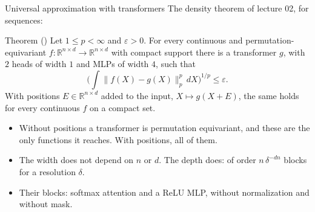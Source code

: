 \documentclass[10pt]{beamer}
\newcommand{\R}{\mathbb{R}}
\begin{document}
\begin{frame}{Universal approximation with transformers}
\small
The density theorem of lecture 02, for sequences:
\begin{mathbox}{Theorem (\citet{yun2020})}
Let $1\le p<\infty$ and $\varepsilon>0$. For every continuous and permutation-equivariant $f\colon\R^{n\times d}\to\R^{n\times d}$ with compact support there is a transformer $g$, with $2$ heads of width $1$ and MLPs of width $4$, such that
\[
\Big(\int\|f(X)-g(X)\|_p^p\,dX\Big)^{1/p}\le\varepsilon .
\]
With positions $E\in\R^{n\times d}$ added to the input, $X\mapsto g(X+E)$, the same holds for every continuous $f$ on a compact set.
\end{mathbox}
\footnotesize
\begin{itemize}
\item \alert{Without positions} a transformer is permutation equivariant, and these are the only functions it reaches. \alert{With positions}, all of them.
\item The width does not depend on $n$ or $d$. The depth does: of order $n\,\delta^{-dn}$ blocks for a resolution $\delta$.
\item Their blocks: softmax attention and a ReLU MLP, without normalization and without mask.
\end{itemize}
\end{frame}
\end{document}
